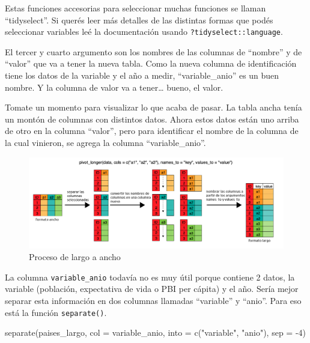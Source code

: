 \documentclass[
  openany]{book}
\newenvironment{Shaded}{\begin{snugshade}}{\end{snugshade}}
\newcommand{\AttributeTok}[1]{\textcolor[rgb]{0.77,0.63,0.00}{#1}}
\newcommand{\DecValTok}[1]{\textcolor[rgb]{0.00,0.00,0.81}{#1}}
\newcommand{\FunctionTok}[1]{\textcolor[rgb]{0.00,0.00,0.00}{#1}}
\newcommand{\NormalTok}[1]{#1}
\newcommand{\SpecialCharTok}[1]{\textcolor[rgb]{0.00,0.00,0.00}{#1}}
\newcommand{\StringTok}[1]{\textcolor[rgb]{0.31,0.60,0.02}{#1}}
\begin{document}
Estas funciones accesorias para seleccionar muchas funciones se llaman ``tidyselect''.
Si querés leer más detalles de las distintas formas que podés seleccionar variables leé la documentación usando \texttt{?tidyselect::language}.

El tercer y cuarto argumento son los nombres de las columnas de ``nombre'' y de ``valor'' que va a tener la nueva tabla.
Como la nueva columna de identificación tiene los datos de la variable y el año a medir, ``variable\_anio'' es un buen nombre.
Y la columna de valor va a tener\ldots{} bueno, el valor.

Tomate un momento para visualizar lo que acaba de pasar.
La tabla ancha tenía un montón de columnas con distintos datos.
Ahora estos datos están uno arriba de otro en la columna ``valor'', pero para identificar el nombre de la columna de la cual vinieron, se agrega la columna ``variable\_anio''.

\begin{figure}
\centering
\includegraphics{img/ancho-a-largo.png}
\caption{Proceso de largo a ancho}
\end{figure}

La columna \texttt{variable\_anio} todavía no es muy útil porque contiene 2 datos, la variable (población, expectativa de vida o PBI per cápita) y el año.
Sería mejor separar esta información en dos columnas llamadas ``variable'' y ``anio''.
Para eso está la función \texttt{separate()}.

\begin{Shaded}
\begin{Highlighting}[]
\FunctionTok{separate}\NormalTok{(paises\_largo, }
         \AttributeTok{col =}\NormalTok{ variable\_anio, }
         \AttributeTok{into =} \FunctionTok{c}\NormalTok{(}\StringTok{"variable"}\NormalTok{, }\StringTok{"anio"}\NormalTok{), }
         \AttributeTok{sep =} \SpecialCharTok{{-}}\DecValTok{4}\NormalTok{)}
\end{Highlighting}
\end{Shaded}
\end{document}
